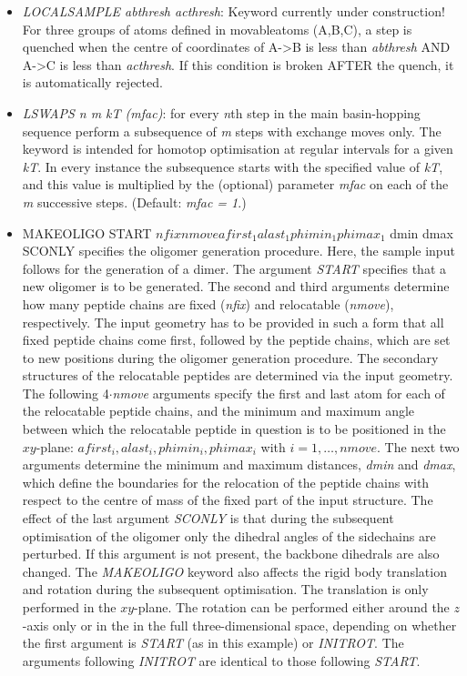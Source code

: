 \documentclass[12pt,a4paper,dvips]{article}
\begin{document}
\begin{itemize}
\item {\it LOCALSAMPLE abthresh acthresh\/}: Keyword currently under construction! For three groups of atoms defined in movableatoms
(A,B,C), a step is quenched when the centre of coordinates of A->B is less than {\it abthresh} AND A->C is less than {\it acthresh}. 
If this condition is broken AFTER the quench, it is automatically rejected.

\item {\it LSWAPS n m kT (mfac)\/}: for every {\it n}th step in the main basin-hopping sequence perform a subsequence of {\it m} steps with exchange moves only. The keyword is intended for homotop optimisation at regular intervals for a given {\it kT}. In every instance the subsequence starts with the specified value of {\it kT}, and this value is multiplied by the (optional) parameter {\it mfac} on each of the {\it m} successive steps. (Default: {\it mfac = 1}.)

\item MAKEOLIGO START $nfix nmove afirst_1 alast_1 phimin_1 phimax_1$ dmin dmax SCONLY
specifies the oligomer generation procedure. Here, the sample input follows for the generation of a dimer.
The argument \textit{START} specifies that a new oligomer is to be generated.
The second and third arguments determine how many peptide chains are fixed ({\it nfix}) and relocatable ({\it nmove}), respectively.
The input geometry has
to be provided in such a form that all fixed peptide chains come first, followed by the peptide chains,
which are set to
new positions during the oligomer generation procedure. The secondary structures of the relocatable peptides are determined via the input
geometry. The following 4$\cdot${\it nmove} arguments specify the first and last atom for each of the relocatable peptide chains, and the
minimum and maximum angle between which the relocatable peptide in question is to be positioned in the $xy$-plane:
$afirst_i, alast_i, phimin_i, phimax_i$ with $i=1,\ldots,nmove$.
The next two arguments determine the minimum and maximum distances, {\it dmin} and {\it dmax}, which define the boundaries
for the relocation of the peptide chains with respect to the centre of mass of the fixed part of the input structure.
The effect of the last argument \textit{SCONLY} is that during the subsequent optimisation of the oligomer only the dihedral angles
of the sidechains are perturbed. If this argument is not present, the backbone dihedrals are also changed.
The \textit{MAKEOLIGO} keyword also affects the rigid body translation and rotation during the subsequent optimisation. The translation is
only performed in the $xy$-plane. The rotation can be performed either around the $z$-axis only or in the in the full three-dimensional
space, depending on whether the first argument is \textit{START} (as in this example) or \textit{INITROT}. The arguments following
\textit{INITROT} are identical to those following \textit{START}.


\end{itemize}
\end{document}
